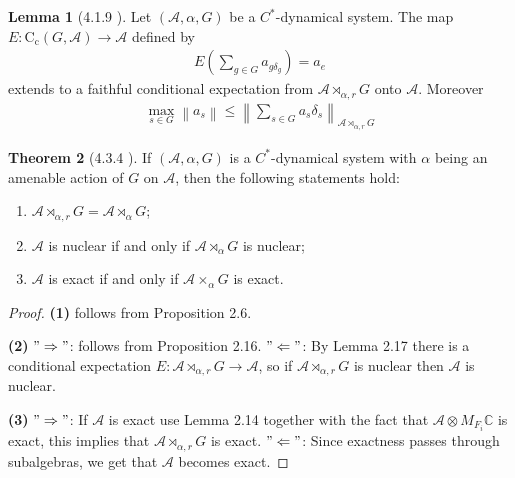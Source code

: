 \documentclass[10pt,oneside,openany,final]{memoir}
\theoremstyle{definition}
\newtheorem{theorem}{Theorem}
\newtheorem{lemma}[theorem]{Lemma}
\theoremstyle{Break}
\newcommand{\lv}{\left\lVert}
\newcommand{\rv}{\right\rVert}
\newcommand{\C}{\mathbb{C}}
\newcommand{\A}{\mathcal{A}}
\newcommand{\cc}{\text{C}_{\text{c}}}
\begin{document}
\begin{lemma}[4.1.9 \text{[BO]}]
Let $(\A,\alpha,G)$ be a $C^*$-dynamical system. The map $E \colon \cc(G,\A) \to \A$ defined by
\begin{align*}
E\left(\sum_{g \in G}a_{g \delta_{g}}\right)=a_{e}
\end{align*}
extends to a faithful conditional expectation from $\A \rtimes_{\alpha,r} G$ onto $\A$. Moreover
\begin{align*}
\max_{s \in G} \lv a_{s}\rv \leq \lv \sum_{s \in G} a_{s} \delta_{s}\rv_{\A \rtimes_{\alpha,r}G}
\end{align*}
\end{lemma}

\begin{theorem}[4.3.4 \text{[BO]}]
If $(\A,\alpha,G)$ is a $C^*$-dynamical system with $\alpha$ being an amenable action of $G$ on $\A$, then the following statements hold:
\begin{enumerate}
\item $\A \rtimes_{\alpha,r}G=\A \rtimes_{\alpha}G$;\\
\item $\A$ is nuclear if and only if $\A\rtimes_{\alpha}G$ is nuclear;\\
\item $\A$ is exact if and only if $\A \times_{\alpha}G$ is exact.
\end{enumerate}
\begin{proof}
\textbf{(1)} follows from Proposition 2.6. 

\noindent \textbf{(2)} $" \Rightarrow"$: follows from Proposition 2.16. $" \Leftarrow"$: By Lemma 2.17 there is a conditional expectation $E \colon \A \rtimes_{\alpha,r}G \to \A$, so if $\A \rtimes_{\alpha,r}G$ is nuclear then $\A$ is nuclear.

\noindent \textbf{(3)} $"\Rightarrow"$: If $\A$ is exact use Lemma 2.14 together with the fact that $\A \otimes M_{F_{i}} \C$ is exact, this implies that $\A \rtimes_{\alpha,r}G$ is exact. $"\Leftarrow"$: Since exactness passes through subalgebras, we get that $\A$ becomes exact.
\end{proof}
\end{theorem}
\end{document}
